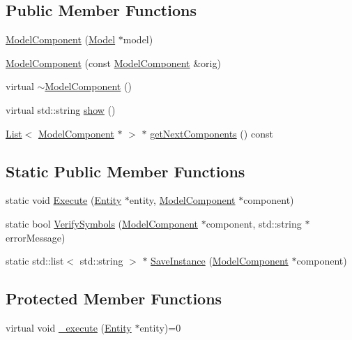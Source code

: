 \subsection*{Public Member Functions}
\begin{DoxyCompactItemize}
\item 
\hyperlink{class_model_component_a1e2b24c3592711a9bd3f131706b7f0c7}{Model\-Component} (\hyperlink{class_model}{Model} $\ast$model)
\item 
\hyperlink{class_model_component_a5b95933e7a265039eb01f6ec88d92675}{Model\-Component} (const \hyperlink{class_model_component}{Model\-Component} \&orig)
\item 
virtual \hyperlink{class_model_component_a6d490d6a2fdf66ad13ed8adcc39ec611}{$\sim$\-Model\-Component} ()
\item 
virtual std\-::string \hyperlink{class_model_component_ad8bc846e36b028eab7efb7da6c549eca}{show} ()
\item 
\hyperlink{class_list}{List}$<$ \hyperlink{class_model_component}{Model\-Component} $\ast$ $>$ $\ast$ \hyperlink{class_model_component_a89fe8e3fb064c68aebbecd36eeed7d43}{get\-Next\-Components} () const 
\end{DoxyCompactItemize}
\subsection*{Static Public Member Functions}
\begin{DoxyCompactItemize}
\item 
static void \hyperlink{class_model_component_a08c5312c2f94f6621577cc1836c2d3e0}{Execute} (\hyperlink{class_entity}{Entity} $\ast$entity, \hyperlink{class_model_component}{Model\-Component} $\ast$component)
\item 
static bool \hyperlink{class_model_component_a0798a220cf903b34ce28c40e136d207d}{Verify\-Symbols} (\hyperlink{class_model_component}{Model\-Component} $\ast$component, std\-::string $\ast$error\-Message)
\item 
static std\-::list$<$ std\-::string $>$ $\ast$ \hyperlink{class_model_component_a45d3805f9b7051b7acc142e5d85cded6}{Save\-Instance} (\hyperlink{class_model_component}{Model\-Component} $\ast$component)
\end{DoxyCompactItemize}
\subsection*{Protected Member Functions}
\begin{DoxyCompactItemize}
\item 
virtual void \hyperlink{class_model_component_ae3fcf8bbdd8368c882438424aa73f714}{\-\_\-execute} (\hyperlink{class_entity}{Entity} $\ast$entity)=0
\end{DoxyCompactItemize}
